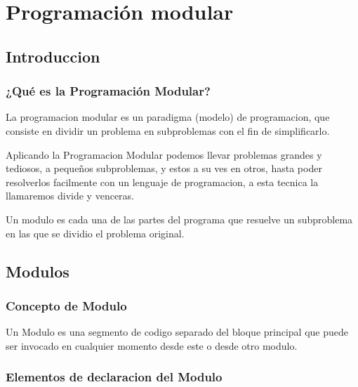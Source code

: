 
\chapter{Programación modular}
\renewcommand{\chaptername}{Lecture}
\setlength{\parindent}{0pt}
\section{Introduccion}

\subsection{¿Qué es la Programación Modular?}


La programacion modular es un paradigma (modelo) de programacion, que consiste en dividir un problema en subproblemas con el fin de simplificarlo.

Aplicando la Programacion Modular podemos llevar problemas grandes y tediosos, a pequeños subproblemas, y estos a su ves en otros, hasta poder resolverlos facilmente con un lenguaje de programacion, a esta tecnica la llamaremos divide y venceras.

Un modulo es cada una de las partes del programa que resuelve un subproblema en las que se dividio el problema original.

\section{Modulos}

\subsection{Concepto de Modulo}

Un Modulo es una segmento de codigo separado del bloque principal que puede ser invocado en cualquier momento desde este o desde otro modulo.

\subsection{Elementos de declaracion del Modulo}

